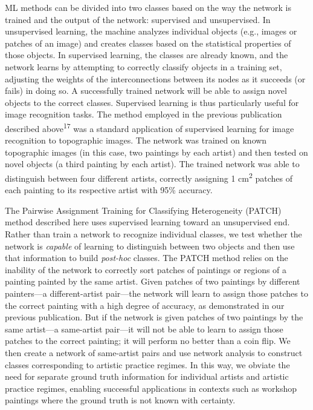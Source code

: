 \documentclass[11pt]{article}
\begin{document}
ML methods can be divided into two classes based on the way the network
is trained and the output of the network: supervised and unsupervised.
In unsupervised learning, the machine analyzes individual objects (e.g.,
images or patches of an image) and creates classes based on the
statistical properties of those objects. In supervised learning, the
classes are already known, and the network learns by attempting to
correctly classify objects in a training set, adjusting the weights of
the interconnections between its nodes as it succeeds (or fails) in
doing so. A successfully trained network will be able to assign novel
objects to the correct classes. Supervised learning is thus particularly
useful for image recognition tasks. The method employed in the previous
publication described above\textsuperscript{17} was a standard
application of supervised learning for image recognition to topographic
images. The network was trained on known topographic images (in this
case, two paintings by each artist) and then tested on novel objects (a
third painting by each artist). The trained network was able to
distinguish between four different artists, correctly assigning
1 cm\textsuperscript{2} patches of each painting to its respective artist
with 95\% accuracy.

The Pairwise Assignment Training for Classifying Heterogeneity (PATCH) method described here uses supervised learning toward an
unsupervised end. Rather than train a network to recognize individual
classes, we test whether the network is \emph{capable} of learning to
distinguish between two objects and then use that information to build
\emph{post-hoc} classes. The PATCH method relies on the inability of the
network to correctly sort patches of paintings or regions of a painting
painted by the same artist. Given patches of two paintings by different
painters---a different-artist pair---the network will learn to assign
those patches to the correct painting with a high degree of accuracy, as
demonstrated in our previous publication. But if the network is given
patches of two paintings by the same artist---a same-artist pair---it
will not be able to learn to assign those patches to the correct
painting; it will perform no better than a coin flip. We then create a
network of same-artist pairs and use network analysis to construct
classes corresponding to artistic practice regimes. In this way, we
obviate the need for separate ground truth information for individual
artists and artistic practice regimes, enabling successful applications
in contexts such as workshop paintings where the ground truth is not
known with certainty.
\end{document}
